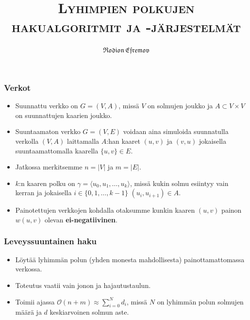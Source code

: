 \documentclass{beamer}
\title{{\rmfamily\scshape Lyhimpien polkujen hakualgoritmit ja -järjestelmät}}
\author{$\mathfrak{Rodion \, Efremov}$}
\date{}
\institute{Tietojenkäsittelytieteen laitos, Helsingin yliopisto}
\begin{document}
\maketitle

\begin{frame}
\frametitle{Verkot}
\begin{itemize}
\item Suunnattu verkko on $G = (V, A)$, missä $V$ on solmujen joukko ja $A \subset V \times V$ on suunnattujen kaarien joukko.

\item Suuntaamaton verkko $G = (V, E)$ voidaan aina simuloida suunnatulla verkolla $(V, A)$ laittamalla $A$:han kaaret $(u, v)$ ja $(v, u)$ jokaisella suuntaamattomalla kaarella $\{u, v\} \in E$.

\item Jatkossa merkitsemme $n = |V|$ ja $m = |E|$.

\item $k$:n kaaren polku on $\gamma = \langle u_0, u_1, \dots, u_k \rangle$, missä kukin solmu esiintyy vain kerran ja jokaisella $i \in \{ 0, 1, \dots, k - 1 \}$ $(u_i, u_{i + 1}) \in A$.

\item Painotettujen verkkojen kohdalla otaksumme kunkin kaaren $(u, v)$ painon $w(u, v)$ olevan \textbf{ei-negatiivinen}.
\end{itemize}
\end{frame}

\begin{frame}
\frametitle{Leveyssuuntainen haku}
\begin{itemize}
\item Löytää lyhimmän polun (yhden monesta mahdollisesta) painottamattomassa verkossa.
\item Toteutus vaatii vain jonon ja hajautustaulun.
\item Toimii ajassa $\mathcal{O}(n + m) \approx \sum_{i = 0}^N d_i$, missä $N$ on lyhimmän polun solmujen määrä ja $d$ keskiarvoinen solmun aste.
\end{itemize}
\end{frame}
\end{document}
